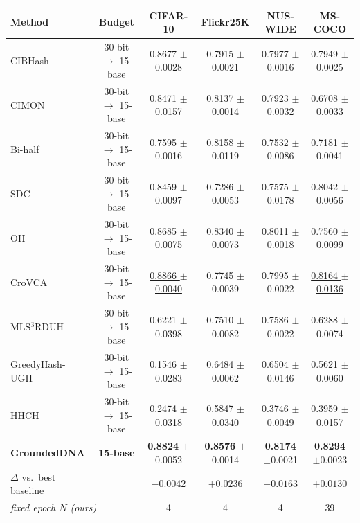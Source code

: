 \begin{tabular}{lccccc}
\toprule
Method & Budget & CIFAR-10 & Flickr25K & NUS-WIDE & MS-COCO \\
\midrule
CIBHash        & 30-bit $\rightarrow$ 15-base & 0.8677 {\scriptsize$\pm$0.0028} & 0.7915 {\scriptsize$\pm$0.0021} & 0.7977 {\scriptsize$\pm$0.0016} & 0.7949 {\scriptsize$\pm$0.0025} \\
CIMON          & 30-bit $\rightarrow$ 15-base & 0.8471 {\scriptsize$\pm$0.0157} & 0.8137 {\scriptsize$\pm$0.0014} & 0.7923 {\scriptsize$\pm$0.0032} & 0.6708 {\scriptsize$\pm$0.0033} \\
Bi-half        & 30-bit $\rightarrow$ 15-base & 0.7595 {\scriptsize$\pm$0.0016} & 0.8158 {\scriptsize$\pm$0.0119} & 0.7532 {\scriptsize$\pm$0.0086} & 0.7181 {\scriptsize$\pm$0.0041} \\
SDC            & 30-bit $\rightarrow$ 15-base & 0.8459 {\scriptsize$\pm$0.0097} & 0.7286 {\scriptsize$\pm$0.0053} & 0.7575 {\scriptsize$\pm$0.0178} & 0.8042 {\scriptsize$\pm$0.0056} \\
OH             & 30-bit $\rightarrow$ 15-base & 0.8685 {\scriptsize$\pm$0.0075} & \underline{0.8340 {\scriptsize$\pm$0.0073}} & \underline{0.8011 {\scriptsize$\pm$0.0018}} & 0.7560 {\scriptsize$\pm$0.0099} \\
CroVCA         & 30-bit $\rightarrow$ 15-base & \underline{0.8866 {\scriptsize$\pm$0.0040}} & 0.7745 {\scriptsize$\pm$0.0039} & 0.7995 {\scriptsize$\pm$0.0022} & \underline{0.8164 {\scriptsize$\pm$0.0136}} \\
MLS$^3$RDUH    & 30-bit $\rightarrow$ 15-base & 0.6221 {\scriptsize$\pm$0.0398} & 0.7510 {\scriptsize$\pm$0.0082} & 0.7586 {\scriptsize$\pm$0.0022} & 0.6288 {\scriptsize$\pm$0.0074} \\
GreedyHash-UGH & 30-bit $\rightarrow$ 15-base & 0.1546 {\scriptsize$\pm$0.0283} & 0.6484 {\scriptsize$\pm$0.0062} & 0.6504 {\scriptsize$\pm$0.0146} & 0.5621 {\scriptsize$\pm$0.0060} \\
HHCH           & 30-bit $\rightarrow$ 15-base & 0.2474 {\scriptsize$\pm$0.0318} & 0.5847 {\scriptsize$\pm$0.0340} & 0.3746 {\scriptsize$\pm$0.0049} & 0.3959 {\scriptsize$\pm$0.0157} \\
\midrule
\textbf{GroundedDNA} & \textbf{15-base} & \textbf{0.8824} {\scriptsize$\pm$0.0052} & \textbf{0.8576} {\scriptsize$\pm$0.0014} & \textbf{0.8174} {\scriptsize$\pm$0.0021} & \textbf{0.8294} {\scriptsize$\pm$0.0023} \\
$\Delta$ vs.\ best baseline & & $-0.0042$ & $+0.0236$ & $+0.0163$ & $+0.0130$ \\
\midrule
\multicolumn{2}{l}{\emph{fixed epoch $N$ (ours)}} & 4 & 4 & 4 & 39 \\
\bottomrule
\end{tabular}


